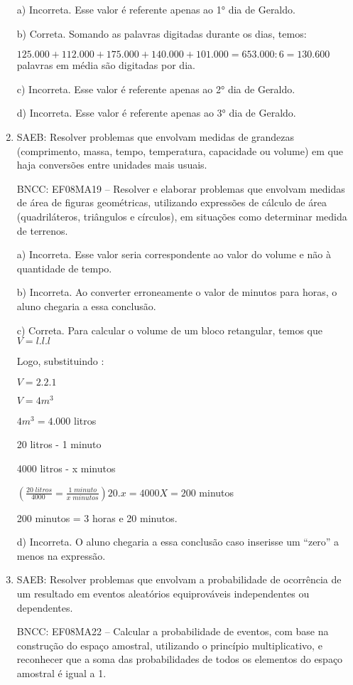 \begin{enumerate}
a) Incorreta. Esse valor é referente apenas ao 1° dia de Geraldo.

b) Correta. Somando as palavras digitadas durante os dias, temos:

$125.000 + 112.000 + 175.000 + 140.000 + 101.000 =
 
 653.000 : 6 = 130.600$ palavras em média são digitadas por dia.

c) Incorreta. Esse valor é referente apenas ao 2° dia de Geraldo.

d) Incorreta. Esse valor é referente apenas ao 3° dia de Geraldo.

\item SAEB: Resolver problemas que envolvam medidas de grandezas (comprimento,
massa, tempo, temperatura, capacidade ou volume) em que haja conversões
entre unidades mais usuais.

BNCC: EF08MA19 -- Resolver e elaborar problemas que envolvam medidas de
área de figuras geométricas, utilizando expressões de cálculo de área
(quadriláteros, triângulos e círculos), em situações como determinar
medida de terrenos.

a) Incorreta. Esse valor seria correspondente ao valor do volume e
não à quantidade de tempo.

b) Incorreta. Ao converter erroneamente o valor de minutos para
horas, o aluno chegaria a essa conclusão.

c) Correta. Para calcular o volume de um bloco retangular, temos
que $V = l.l.l$

Logo, substituindo :

$V= 2.2.1$

$V=4 m^3$

$4m^3 = 4.000$ litros

20 litros - 1 minuto

4000 litros - x minutos

$(\frac{20 \; litros}{4000 \;} = \frac{1 \; minuto}{x \; minutos})
 
 20 . x = 4000
 
 X = 200$ minutos

200 minutos = 3 horas e 20 minutos.

d) Incorreta. O aluno chegaria a essa conclusão caso inserisse um
``zero'' a menos na expressão.

\item SAEB: Resolver problemas que envolvam a probabilidade de ocorrência de
um resultado em eventos aleatórios equiprováveis independentes ou
dependentes.

BNCC: EF08MA22 -- Calcular a probabilidade de eventos, com base na
construção do espaço amostral, utilizando o princípio multiplicativo, e
reconhecer que a soma das probabilidades de todos os elementos do espaço
amostral é igual a 1.


\end{enumerate}
